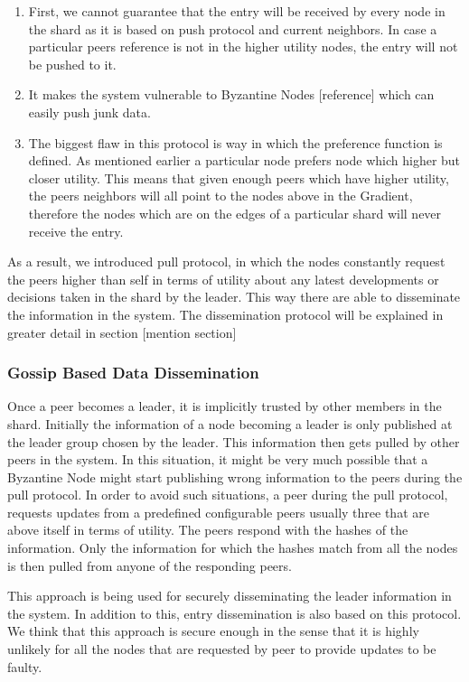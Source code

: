 \documentclass[a4paper, 11pt]{article}
\begin{document}
\begin{enumerate}

\item First, we cannot guarantee that the entry will be received by every node in the shard as it is based on push protocol and current neighbors. In case a particular peers reference is not in the higher utility nodes, the entry will not be pushed to it.

\item It makes the system vulnerable to Byzantine Nodes [reference] which can easily push junk data.

\item The biggest flaw in this protocol is way in which the preference function is defined. As mentioned earlier a particular node prefers node which higher but closer utility. This means that given enough peers which have higher utility, the peers neighbors will all point to the nodes above in the Gradient, therefore the nodes which are on the edges of a particular shard will never receive the entry.

\end{enumerate} 

As a result, we introduced pull protocol, in which the nodes constantly request the peers higher than self in terms of utility about any latest developments or decisions taken in the shard by the leader. This way there are able to disseminate the information in the system. The dissemination protocol will be explained in greater detail in section [mention section]



\subsubsection*{Gossip Based Data Dissemination}
Once a peer becomes a leader, it is implicitly trusted by other members in the shard.
Initially the information of a node becoming a leader is only published at the leader group chosen by the leader. This information then gets pulled by other peers in the system. In this situation, it might be very much possible that a Byzantine Node might start publishing wrong information to the peers during the pull protocol. In order to avoid such situations, a peer during the pull protocol, requests updates from a predefined configurable peers usually three that are above itself in terms of utility.  The peers respond with the hashes of the information. Only the information for which the hashes match from all the nodes is then pulled from anyone of the responding peers. 
\par This approach is being used for securely disseminating the leader information in the system. In addition to this, entry dissemination is also based on this protocol. We think that this approach is secure enough in the sense that it is highly unlikely for all the nodes that are requested by peer to provide updates to be faulty.
\end{document}
